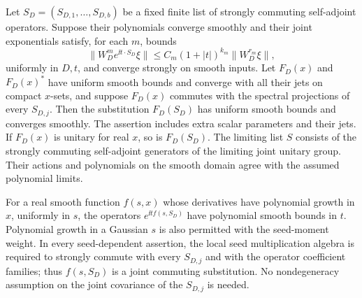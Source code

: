\begin{lemma}
\label{lem:commuting-substitution}
Let $S_D=(S_{D,1},\ldots,S_{D,b})$ be a fixed finite list of
strongly commuting self-adjoint operators.  Suppose their
polynomials converge smoothly and their joint exponentials satisfy,
for each $m$, bounds
\begin{equation}\label{eq:joint-exponential-bound}
 \|W_D^m e^{\ii t\cdot S_D}\xi\|
 \leq C_m(1+|t|)^{k_m}\|W_D^{r_m}\xi\|,
\end{equation}
uniformly in $D,t$, and converge strongly on smooth inputs.
Let $F_D(x)$ and $F_D(x)^*$ have uniform smooth bounds and
converge with all their jets on compact $x$-sets, and suppose
$F_D(x)$ commutes with the spectral projections
of every $S_{D,j}$.  Then the substitution $F_D(S_D)$ has uniform
smooth bounds and converges smoothly.  The assertion includes
extra scalar parameters and their jets.  If $F_D(x)$ is unitary
for real $x$, so is $F_D(S_D)$.
The limiting list $S$ consists of the strongly commuting
self-adjoint generators of the limiting joint unitary group.
Their actions and polynomials on the smooth domain agree with
the assumed polynomial limits.

For a real smooth function $f(s,x)$ whose derivatives have
polynomial growth in $x$, uniformly in $s$, the operators
$e^{\ii t f(s,S_D)}$ have polynomial smooth bounds in $t$.
Polynomial growth in a Gaussian $s$ is also permitted with the
seed-moment weight.  In every seed-dependent assertion, the
local seed multiplication algebra is required to strongly
commute with every $S_{D,j}$ and with the operator coefficient
families; thus $f(s,S_D)$ is a joint commuting substitution.
No nondegeneracy assumption on the joint
covariance of the $S_{D,j}$ is needed.
\end{lemma}

